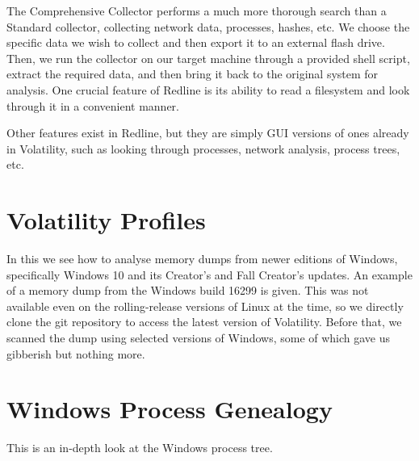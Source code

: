\documentclass{article}
\begin{document}
The Comprehensive Collector performs a much more thorough search than a Standard collector, collecting network data, processes, hashes, etc. We choose the specific data we wish to collect and then export it to an external flash drive. Then, we run the collector on our target machine through a provided shell script, extract the required data, and then bring it back to the original system for analysis. One crucial feature of Redline is its ability to read a filesystem and look through it in a convenient manner.

Other features exist in Redline, but they are simply GUI versions of ones already in Volatility, such as looking through processes, network analysis, process trees, etc.

\section{Volatility Profiles}

In this we see how to analyse memory dumps from newer editions of Windows, specifically Windows 10 and its Creator's and Fall Creator's updates. An example of a memory dump from the Windows build 16299 is given. This was not available even on the rolling-release versions of Linux at the time, so we directly clone the git repository to access the latest version of Volatility. Before that, we scanned the dump using selected versions of Windows, some of which gave us gibberish but nothing more.

\section{Windows Process Genealogy}

This is an in-depth look at the Windows process tree.
\end{document}
